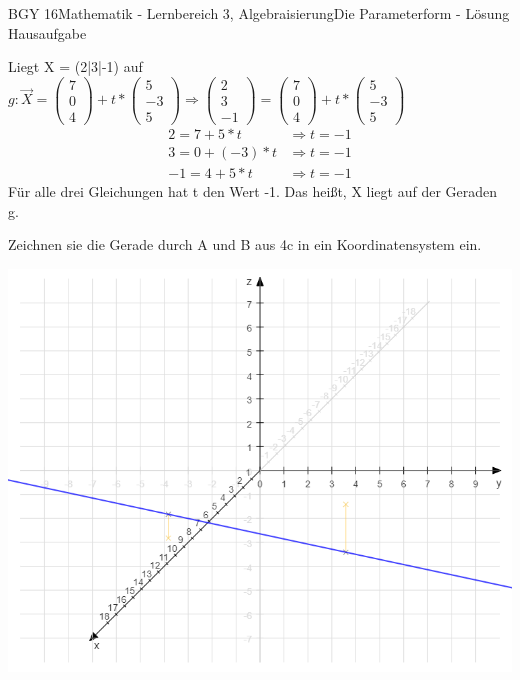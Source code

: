 \documentclass[oneside,openany,headings=optiontotoc,11pt,numbers=noenddot]{scrreprt}
\begin{document}
\begin{worksheet}{BGY 16}{Mathematik - Lernbereich 3, Algebraisierung}{Die Parameterform - Lösung Hausaufgabe}
\begin{framed}
			Liegt X = (2|3|-1) auf \(g: \vec{X} =\left(\begin{array}{c}7\\0\\4\end{array}\right) + t*\left(\begin{array}{c}5\\-3\\5\end{array}\right) \Rightarrow \left(\begin{array}{c}2\\3\\-1\end{array}\right) = \left(\begin{array}{c}7\\0\\4\end{array}\right) + t*\left(\begin{array}{c}5\\-3\\5\end{array}\right)\)
			\[\begin{array}{llc}
			2 = 7 + 5*t & \Rightarrow t = -1 \\
			3 = 0 + (-3)*t & \Rightarrow t = -1\\
			-1 = 4 + 5*t & \Rightarrow t = -1
			\end{array}\]
			Für alle drei Gleichungen hat t den Wert -1. Das heißt, X liegt auf der Geraden g.
		\end{framed}
		\begin{framed}
			\noindent
			Zeichnen sie die Gerade durch A und B aus 4c in ein Koordinatensystem ein.\\
			\begin{center}
				\includegraphics[scale=0.5]{Bilder/S60N4c.png}\\
			\end{center}
		\end{framed}
	\end{worksheet}
\end{document}
